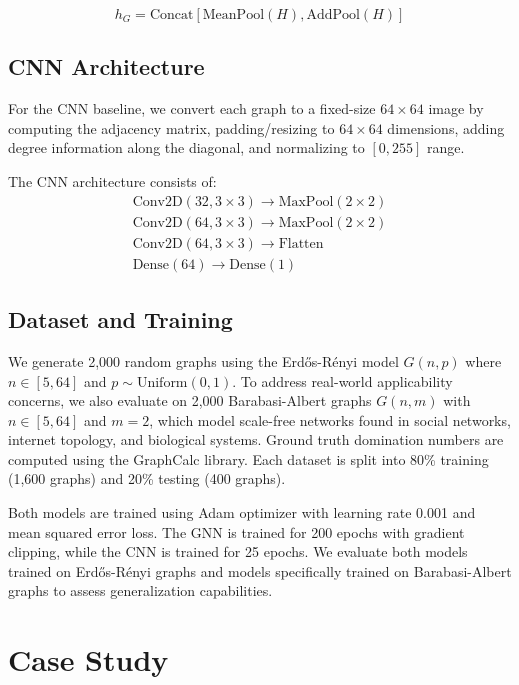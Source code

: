 \documentclass{article}
\begin{document}
\begin{equation}
h_G = \text{Concat}[\text{MeanPool}(H), \text{AddPool}(H)]
\end{equation}

\subsection{CNN Architecture}

For the CNN baseline, we convert each graph to a fixed-size $64 \times 64$ image by computing the adjacency matrix, padding/resizing to $64 \times 64$ dimensions, adding degree information along the diagonal, and normalizing to $[0, 255]$ range.

The CNN architecture consists of:
\begin{align}
\text{Conv2D}(32, 3 \times 3) \rightarrow \text{MaxPool}(2 \times 2) \\
\text{Conv2D}(64, 3 \times 3) \rightarrow \text{MaxPool}(2 \times 2) \\
\text{Conv2D}(64, 3 \times 3) \rightarrow \text{Flatten} \\
\text{Dense}(64) \rightarrow \text{Dense}(1)
\end{align}

\subsection{Dataset and Training}

We generate 2,000 random graphs using the Erdős-Rényi model $G(n, p)$ where $n \in [5, 64]$ and $p \sim \text{Uniform}(0, 1)$. To address real-world applicability concerns, we also evaluate on 2,000 Barabasi-Albert graphs $G(n, m)$ with $n \in [5, 64]$ and $m = 2$, which model scale-free networks found in social networks, internet topology, and biological systems. Ground truth domination numbers are computed using the GraphCalc library. Each dataset is split into 80\% training (1,600 graphs) and 20\% testing (400 graphs).

Both models are trained using Adam optimizer with learning rate 0.001 and mean squared error loss. The GNN is trained for 200 epochs with gradient clipping, while the CNN is trained for 25 epochs. We evaluate both models trained on Erdős-Rényi graphs and models specifically trained on Barabasi-Albert graphs to assess generalization capabilities.

\section{Case Study}
\end{document}
